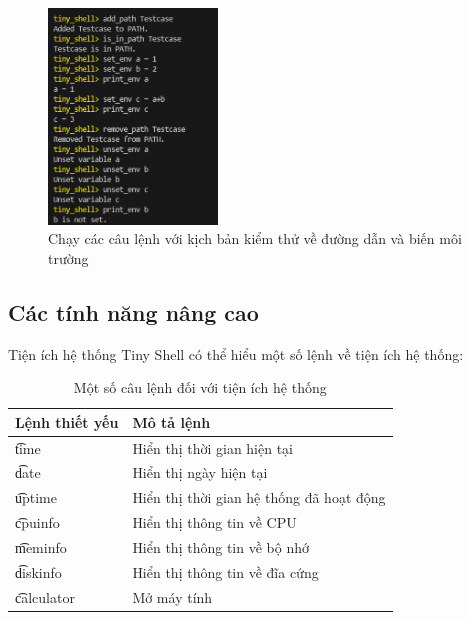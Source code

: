 \begin{frame}
\begin{figure}
    \centering
    \includegraphics[width=0.4\textwidth]{images/09.png}
    \caption{Chạy các câu lệnh với kịch bản kiểm thử về đường dẫn và biến môi trường}
    \label{fig:enter-label}
\end{figure}
\end{frame}

\subsection{Các tính năng nâng cao}

\begin{frame}{Tiện ích hệ thống}
Tiny Shell có thể hiểu một số lệnh về tiện ích hệ thống:
\begin{table}[h]
    \centering
    \begin{tabular}{l|l}
         \textbf{Lệnh thiết yếu} & \textbf{Mô tả lệnh} \\
         \hline
         \t{time} & Hiển thị thời gian hiện tại \\
         \t{date} & Hiển thị ngày hiện tại \\
         \t{uptime} & Hiển thị thời gian hệ thống đã hoạt động \\
         \t{cpuinfo} & Hiển thị thông tin về CPU \\
         \t{meminfo} & Hiển thị thông tin về bộ nhớ \\
         \t{diskinfo} & Hiển thị thông tin về đĩa cứng \\
         \t{calculator} & Mở máy tính \\
    \end{tabular}
    \caption{Một số câu lệnh đối với tiện ích hệ thống}
    \label{tab:system_utilities}
\end{table}
\end{frame}

